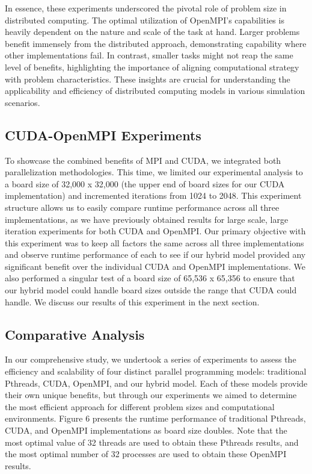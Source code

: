 \documentclass[11pt,twocolumn]{article}
\begin{document}
In essence, these experiments underscored the pivotal role of problem size in distributed computing. The optimal utilization of OpenMPI's capabilities is heavily dependent on the nature and scale of the task at hand. Larger problems benefit immensely from the distributed approach, demonstrating capability where other implementations fail. In contrast, smaller tasks might not reap the same level of benefits, highlighting the importance of aligning computational strategy with problem characteristics. These insights are crucial for understanding the applicability and efficiency of distributed computing models in various simulation scenarios.

\subsection{CUDA-OpenMPI Experiments}

To showcase the combined benefits of MPI and CUDA, we integrated both parallelization methodologies. This time, we limited our experimental analysis to a board size of 32,000 x 32,000 (the upper end of board sizes for our CUDA implementation) and incremented iterations from 1024 to 2048. This experiment structure allows us to easily compare runtime performance across all three implementations, as we have previously obtained results for large scale, large iteration experiments for both CUDA and OpenMPI. Our primary objective with this experiment was to keep all factors the same across all three implementations and observe runtime performance of each to see if our hybrid model provided any significant benefit over the individual CUDA and OpenMPI implementations. We also performed a singular test of a board size of 65,536 x 65,356 to ensure that our hybrid model could handle board sizes outside the range that CUDA could handle. We discuss our results of this experiment in the next section. 

\subsection{Comparative Analysis}

In our comprehensive study, we undertook a series of experiments to assess the efficiency and scalability of four distinct parallel programming models: traditional Pthreads, CUDA, OpenMPI, and our hybrid model. Each of these models provide their own unique benefits, but through our experiments we aimed to determine the most efficient approach for different problem sizes and computational environments. Figure 6 presents the runtime performance of traditional Pthreads, CUDA, and OpenMPI implementations as board size doubles. Note that the most optimal value of 32 threads are used to obtain these Pthreads results, and the most optimal number of 32 processes are used to obtain these OpenMPI results.  
\end{document}
